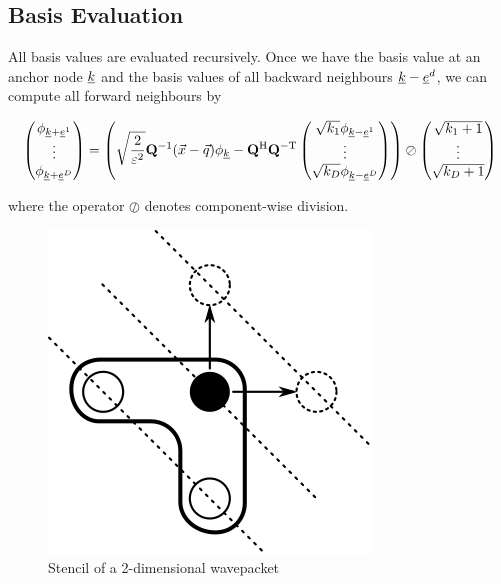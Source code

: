 \documentclass{article}
\begin{document}
\subsection{Basis Evaluation}

All basis values are evaluated recursively. Once we have the basis
value at an anchor node \(\underline{k}\) and the basis values of all
backward neighbours \(\underline{k}-\underline{e}^d\), we can compute all
forward neighbours by

\begin{equation}
  \begin{pmatrix}
    \phi_{\underline{k}+\underline{e}^1} \\
    \vdots \\
    \phi_{\underline{k}+\underline{e}^D}
  \end{pmatrix}
  = \left(
    \sqrt{\frac{2}{\varepsilon^2}} \mathbf{Q}^\mathrm{-1} (\vec{x}-\vec{q}) \phi_{\underline{k}}
    - \mathbf{Q}^\mathrm{H} \mathbf{Q}^\mathrm{-T}
    \begin{pmatrix}
      \sqrt{k_1} \phi_{\underline{k}-\underline{e}^1} \\
      \vdots \\
      \sqrt{k_D} \phi_{\underline{k}-\underline{e}^D}
    \end{pmatrix}
  \right)
  \oslash
  \begin{pmatrix}
    \sqrt{k_1+1}\\
    \vdots \\
    \sqrt{k_D+1}
  \end{pmatrix}
\end{equation}

where the operator \(\oslash\) denotes component-wise division.

\begin{figure}[H]
  \centering
  \includegraphics[]{basis_eval_stencil}
  \caption{Stencil of a 2-dimensional wavepacket}
\end{figure}
\end{document}
